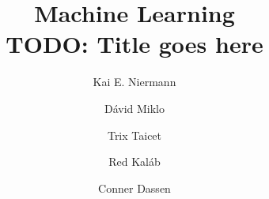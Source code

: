 \documentclass[12pt,a4paper,oneside]{article}
\title{\Huge{Machine Learning}\\\LARGE TODO: Title goes here}
\author{
Kai E. Niermann \and
Dávid Miklo \and 
Trix Taicet \and
Red Kaláb \and
Conner Dassen
}
\date{\DTMusedate{date}}
\begin{document}
\maketitle

\blinddocument


\end{document}
